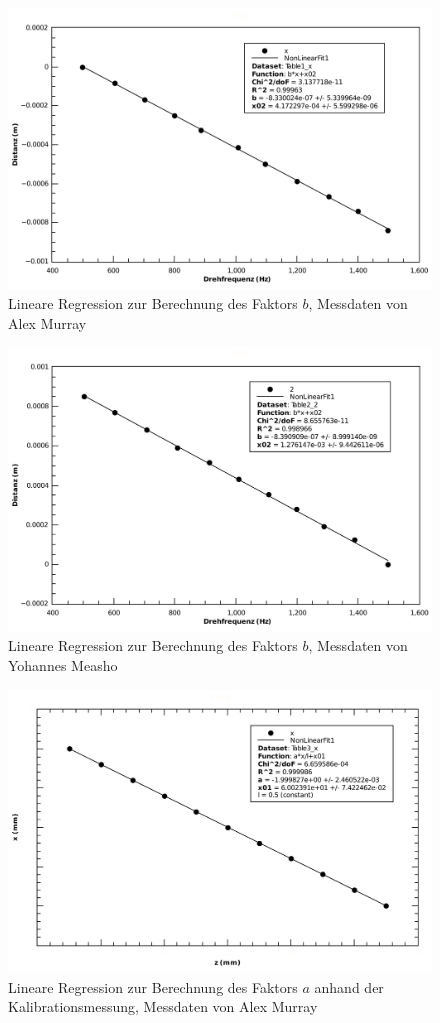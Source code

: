 \begin{figure}[H]
    \center
    \includegraphics[width=.8\textwidth]{images/am-f-x-fit-b.pdf}
    \caption{Lineare Regression zur Berechnung des Faktors $b$, Messdaten von Alex Murray}
    \label{fig:am-f-x-fit-b}
\end{figure}

\begin{figure}[H]
    \center
    \includegraphics[width=.8\textwidth]{images/ym-f-x-fit-b.pdf}
    \caption{Lineare Regression zur Berechnung des Faktors $b$, Messdaten von Yohannes Measho}
    \label{fig:ym-f-x-fit-b}
\end{figure}

\begin{figure}[H]
    \center
    \includegraphics[width=.8\textwidth]{images/am-x-z-fit-a.pdf}
    \caption{Lineare Regression zur Berechnung des Faktors $a$ anhand der Kalibrationsmessung, Messdaten von Alex Murray}
    \label{fig:am-x-z-fit-a}
\end{figure}

